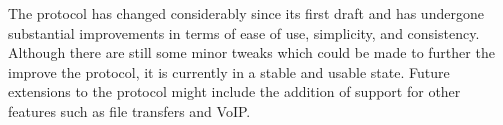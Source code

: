 The protocol has changed considerably since its first draft and has undergone substantial improvements in terms of ease of use, simplicity, and consistency. Although there are still some minor tweaks which could be made to further the improve the protocol, it is currently in a stable and usable state. Future extensions to the protocol might include the addition of support for other features such as file transfers and VoIP.
